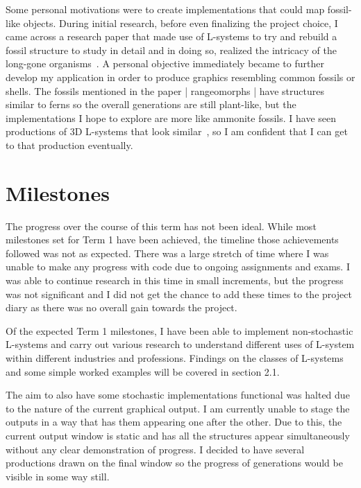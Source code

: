 \documentclass[]{interim_report}
\begin{document}
Some personal motivations were to create implementations that could map fossil-like objects. During initial research, before even finalizing the project choice, I came across a research paper that made use of L-systems to try and rebuild a fossil structure to study in detail and in doing so, realized the intricacy of the long-gone organisms~\cite{JHC:2014}. A personal objective immediately became to further develop my application in order to produce graphics resembling common fossils or shells. The fossils mentioned in the paper | rangeomorphs | have structures similar to ferns so the overall generations are still plant-like, but the implementations I hope to explore are more like ammonite fossils. I have seen productions of 3D L-systems that look similar~\cite{PAL:2008}, so I am confident that I can get to that production eventually.

\section{Milestones}

The progress over the course of this term has not been ideal. While most milestones set for Term 1 have been achieved, the timeline those achievements followed was not as expected. There was a large stretch of time where I was unable to make any progress with code due to ongoing assignments and exams. I was able to continue research in this time in small increments, but the progress was not significant and I did not get the chance to add these times to the project diary as there was no overall gain towards the project. 

Of the expected Term 1 milestones, I have been able to implement non-stochastic L-systems and carry out various research to understand different uses of L-system within different industries and professions. Findings on the classes of L-systems and some simple worked examples will be covered in section 2.1. 

The aim to also have some stochastic implementations functional was halted due to the nature of the current graphical output. I am currently unable to stage the outputs in a way that has them appearing one after the other. Due to this, the current output window is static and has all the structures appear simultaneously without any clear demonstration of progress. I decided to have several productions drawn on the final window so the progress of generations would be visible in some way still.
\newline
\end{document}
